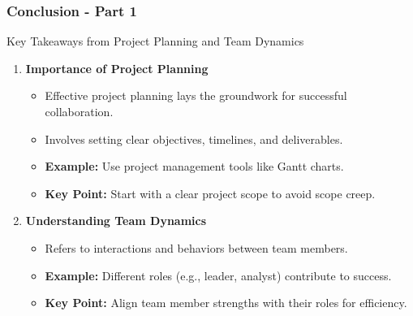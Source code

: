 \documentclass[aspectratio=169]{beamer}
\begin{document}
\begin{frame}[fragile]
    \frametitle{Conclusion - Part 1}
    \begin{block}{Key Takeaways from Project Planning and Team Dynamics}
        \begin{enumerate}
            \item \textbf{Importance of Project Planning}
            \begin{itemize}
                \item Effective project planning lays the groundwork for successful collaboration.
                \item Involves setting clear objectives, timelines, and deliverables.
                \item \textbf{Example:} Use project management tools like Gantt charts.
                \item \textbf{Key Point:} Start with a clear project scope to avoid scope creep.
            \end{itemize}

            \item \textbf{Understanding Team Dynamics}
            \begin{itemize}
                \item Refers to interactions and behaviors between team members.
                \item \textbf{Example:} Different roles (e.g., leader, analyst) contribute to success.
                \item \textbf{Key Point:} Align team member strengths with their roles for efficiency.
            \end{itemize}
        \end{enumerate}
    \end{block}
\end{frame}
\end{document}
